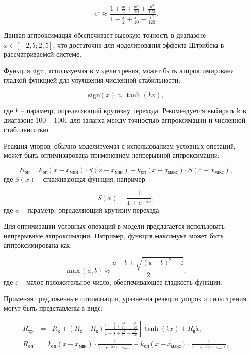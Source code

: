 \begin{equation*}
    e^x \approx \frac{1 + \frac{x}{2} + \frac{x^2}{10} + \frac{x^3}{120}}{1 - \frac{x}{2} + \frac{x^2}{10} - \frac{x^3}{120}}.
\end{equation*}

Данная аппроксимация обеспечивает высокую точность в диапазоне $x \in [-2,5; 2,5]$,
что достаточно для моделирования эффекта Штрибека в рассматриваемой системе.

Функция sign, используемая в модели трения, может быть аппроксимирована
гладкой функцией для улучшения численной стабильности:

\begin{equation*}
    \text{sign}(x) \approx \tanh(kx),
\end{equation*}

где $k$ -- параметр, определяющий крутизну перехода. Рекомендуется выбирать k в диапазоне
$100 \div 1000$ для баланса между точностью аппроксимации и численной стабильностью.

Реакция упоров, обычно моделируемая с использованием условных операций, может быть
оптимизирована применением непрерывной аппроксимации:

\begin{equation*}
    R_\text{оп} = k_\text{оп}(x - x_\text{мин})\cdot S(x - x_\text{мин}) + k_\text{оп}(x - x_\text{макс})\cdot S(x - x_\text{макс}),
\end{equation*}
где $S(x)$ -- сглаживающая функция, например:

\begin{equation*}
    S(x) = \frac{1}{1 + e^{-\alpha x}},
\end{equation*}
где $\alpha$ -- параметр, определяющий крутизну перехода.

Для оптимизации условных операций в модели предлагается
использовать непрерывные аппроксимации. Например, функция
максимума может быть аппроксимирована как:

\begin{equation*}
    \max(a, b) \approx \frac{a + b + \sqrt{(a - b)^2 + \varepsilon}}{2},
\end{equation*}
где $\varepsilon$ -- малое положительное число, обеспечивающее гладкость функции.

Применяя предложенные оптимизации, уравнения реакции упоров и силы трения могут быть представлены в виде:

\begin{equation}
    \begin{alignedat}{2}
        R_\text{тр} & = \left[R_\text{к} + (R_\text{с} - R_\text{к})\frac{1 + \frac{z}{2} + \frac{z^2}{10} + \frac{z^3}{120}}{1 - \frac{z}{2} + \frac{z^2}{10} - \frac{z^3}{120}}\right]\tanh(k\dot{x}) + R_\text{в}\dot{x}, \\
        R_\text{оп} & = k_\text{оп}(x - x_\text{мин})\cdot \frac{1}{1 + e^{-\alpha(x - x_\text{мин})}} + k_\text{оп}(x - x_\text{макс})\cdot \frac{1}{1 + e^{-\alpha(x - x_\text{макс})}},
    \end{alignedat}
\end{equation}

